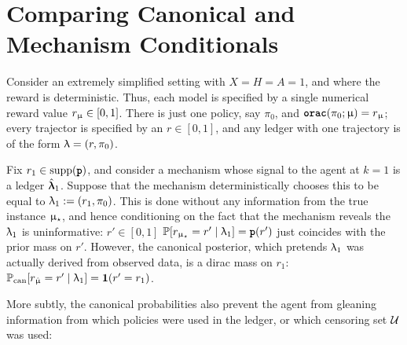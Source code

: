 \section{Comparing Canonical and Mechanism Conditionals \label{app:canonical_vs_mechanism}}
\begin{example} Consider an extremely simplified setting with $X = H = A = 1$, and where the reward is deterministic. Thus, each model is specified by a single numerical reward value $r_{\upmu} \in [0,1]$. There is just one policy, say $\pi_0$, and ${\normalfont \texttt{\textbf{orac}}}(\pi_0;\upmu) = r_{\upmu}$; every trajector is specified by an $r \in [0,1]$, and any ledger with one trajectory is of the form $\uplambda = (r,\pi_0)$.


Fix $r_1 \in \mathrm{supp}({\normalfont \texttt{\textbf{p}}})$, and consider a mechanism whose signal to the agent at $k = 1$ is a ledger $\hat{\bm{\uplambda}}_1$. Suppose that the mechanism  deterministically chooses this to be equal to $\uplambda_1 := (r_1,\pi_0)$. This  is done without any information from the true instance $\upmu_{\star}$, and hence conditioning on the fact that the mechanism reveals the $\uplambda_1$ is uninformative: $r' \in [0,1]$ $\operatorname{\mathbb{P}}[r_{\upmu_{\star}} = r' \mid \uplambda_1] = {\normalfont \texttt{\textbf{p}}}(r')$ just coincides with the prior mass on $r'$. However, the canonical posterior, which pretends $\uplambda_1$ was actually derived from observed data, is a dirac mass on $r_1$: $\operatorname{\mathbb{P}}_{\mathrm{can}}[ r_{\hat{\upmu}} = r' \mid \uplambda_1] = \mathbf{1}( r' = r_1)$.
\end{example}
More subtly, the canonical probabilities also prevent the agent from gleaning information from which policies were used in the ledger, or which censoring set $\mathcal{U}$ was used:
